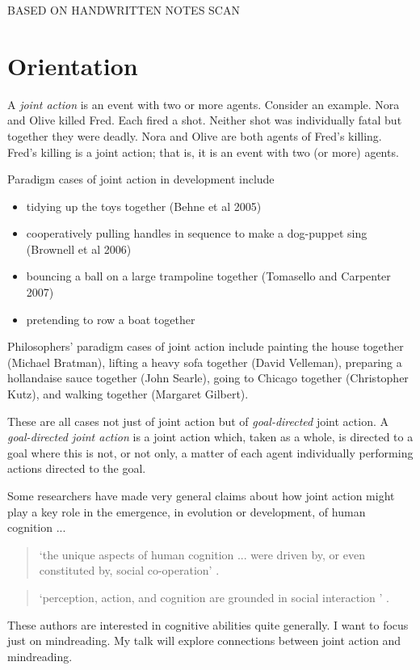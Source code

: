\documentclass[12pt,a4paper]{extarticle}
\begin{document}
\setlength\footnotesep{1em}


\maketitle

BASED ON  HANDWRITTEN NOTES SCAN

\section{Orientation}
A \emph{joint action} is an event with two or more agents. 
Consider an example.
Nora and Olive killed Fred.  
Each fired a shot.
Neither shot was individually fatal but together they were deadly.
Nora and Olive are both agents of Fred's killing.
Fred's killing is a joint action; that is, it is an event with two (or more) agents.


Paradigm cases of joint action in development include
%
\begin{itemize}
\item tidying up the toys together 
(Behne et al 2005)
\item cooperatively pulling handles in sequence to make a dog-puppet sing 
(Brownell et al 2006)
\item bouncing a ball on a large trampoline together 
(Tomasello and Carpenter 2007)
\item pretending to row a boat together
\end{itemize}
%
Philosophers' paradigm cases of joint action include painting the house together (Michael Bratman), lifting a heavy sofa together (David Velleman), preparing a hollandaise sauce together (John Searle), going to Chicago together (Christopher Kutz), and walking together (Margaret Gilbert).

These are all cases not just of joint action but of \emph{goal-directed} joint action.
A \emph{goal-directed joint action} is a joint action which, taken as a whole, is directed to a goal where this is not, or not only, a matter of each agent individually performing actions directed to the goal.


Some researchers have made very general claims about how  joint action might play a key role in the emergence, in evolution or development, of human cognition ...
%
\begin{quote} 
`the unique aspects of human cognition ... were driven by, or even constituted by, social co-operation'
\citep[p.\ 1]{Moll:2007gu}.
\end{quote}
%
\begin{quote} 
`perception, action, and cognition are grounded in social interaction%
' \citep[p.\ 103]{Knoblich:2006bn}.
\end{quote}
%
These authors are interested in cognitive abilities quite generally.  
I want to focus just on mindreading.
My talk will explore connections between joint action and mindreading.
\end{document}
